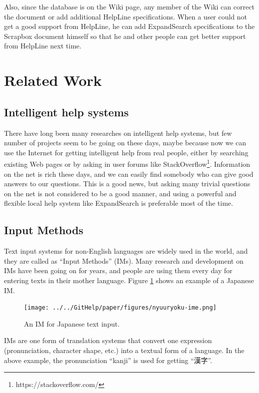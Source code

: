 \documentclass[manuscript,screen,review]{acmart}
\def\HL{\textsf{HelpLine}}
\def\ES{\textsf{ExpandSearch}}
\def\SB{\textsf{Scrapbox}}
\begin{document}
Also, since the database is on the Wiki page, any member of the
Wiki can correct the document or add additional {\HL} specifications.
When a user could not get a good support from {\HL}, he can add
{\ES} specifications to the {\SB} document himself
so that he and other people can get better support
from {\HL} next time.

\section{Related Work}

\subsection{Intelligent help systems}

There have long been many researches on
intelligent help systems\cite{Delisle:2002:UIH:606412.606415},
but few number of projects seem to be going on these days,
maybe because now we can use the Internet for getting intelligent help from
real people,
either by searching existing Web pages or 
by asking in user forums like StackOverflow\footnote{
  \textsf{https://stackoverflow.com/}
}.
Information on the net is rich these days, and we can easily
find somebody who can give good answers to our questions.
This is a good news, but 
asking many trivial questions on the net is not considered to be a
good manner, and
using a powerful and flexible local help system like {\ES} is
preferable most of the time.

\subsection{Input Methods}

Text input systems for non-English languages are widely used
in the world,
and they are called as ``Input Methods'' (IMs).
%
Many research and development on IMs have been going on for years, and
people are using them every day for entering texts in their mother language.
Figure \ref{gyaim} shows an example of a Japanese IM.

\begin{figure}[H]
  \centerline{\texttt{[image: ../../GitHelp/paper/figures/nyuuryoku-ime.png]}}
  \caption{An IM for Japanese text input.}
  \label{gyaim}
\end{figure}

IMs are one form of translation systems that convert one
expression (pronunciation, character shape, etc.)
into a textual form of a language.
In the above example, the pronunciation ``kanji''
is used for getting ``漢字''.
\end{document}
